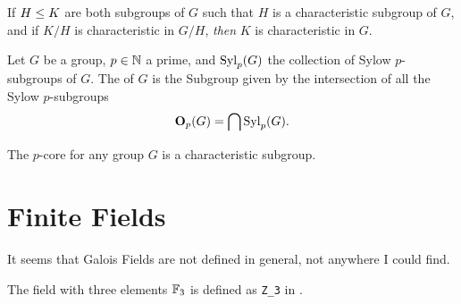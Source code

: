 \begin{theorem}
If  $H\leq K$ are both subgroups of $G$ such that $H$ is
a characteristic subgroup of $G$, and if $K/H$ is characteristic in
$G/H$, \emph{then} $K$ is characteristic in $G$.
\end{theorem}

\begin{definition}
Let $G$ be a group, $p\in\mathbb{N}$ a prime, and $\mathop{\rm Syl}\nolimits_{p}(G)$ the
collection of Sylow $p$-subgroups of $G$. The  of $G$
is the Subgroup given by the intersection of all the Sylow $p$-subgroups
\begin{equation*}
\mathbf{O}_{p}(G) = \bigcap \mathop{\rm Syl}\nolimits_{p}(G).
\end{equation*}
\end{definition}

\begin{theorem}
The $p$-core for any group $G$ is a characteristic subgroup.
\end{theorem}

\section{Finite Fields}

It seems that Galois Fields are not defined in
general, not anywhere I could find.

\begin{example}[{$\FF_{3}$}]
The field with three elements $\FF_{3}$ is defined as \lstinline!Z_3!
in .
\end{example}
